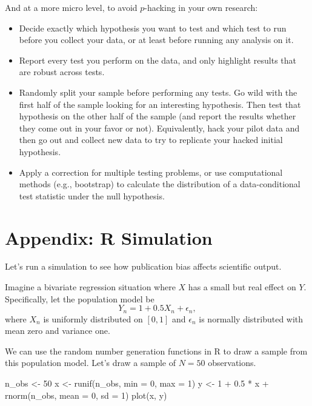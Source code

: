 \documentclass[
  12pt,
  oneside,openany]{book}
\newenvironment{Shaded}{\begin{snugshade}}{\end{snugshade}}
\newcommand{\AttributeTok}[1]{\textcolor[rgb]{0.77,0.63,0.00}{#1}}
\newcommand{\DecValTok}[1]{\textcolor[rgb]{0.00,0.00,0.81}{#1}}
\newcommand{\FloatTok}[1]{\textcolor[rgb]{0.00,0.00,0.81}{#1}}
\newcommand{\FunctionTok}[1]{\textcolor[rgb]{0.00,0.00,0.00}{#1}}
\newcommand{\NormalTok}[1]{#1}
\newcommand{\OtherTok}[1]{\textcolor[rgb]{0.56,0.35,0.01}{#1}}
\newcommand{\SpecialCharTok}[1]{\textcolor[rgb]{0.00,0.00,0.00}{#1}}
\begin{document}
And at a more micro level, to avoid \(p\)-hacking in your own research:

\begin{itemize}
\item
  Decide exactly which hypothesis you want to test and which test to run before you collect your data, or at least before running any analysis on it.
\item
  Report every test you perform on the data, and only highlight results that are robust across tests.
\item
  Randomly split your sample before performing any tests. Go wild with the first half of the sample looking for an interesting hypothesis. Then test that hypothesis on the other half of the sample (and report the results whether they come out in your favor or not). Equivalently, hack your pilot data and then go out and collect new data to try to replicate your hacked initial hypothesis.
\item
  Apply a correction for multiple testing problems, or use computational methods (e.g., bootstrap) to calculate the distribution of a data-conditional test statistic under the null hypothesis.
\end{itemize}

\hypertarget{appendix-r-simulation}{%
\section{Appendix: R Simulation}\label{appendix-r-simulation}}

Let's run a simulation to see how publication bias affects scientific output.

Imagine a bivariate regression situation where \(X\) has a small but real effect on \(Y\). Specifically, let the population model be
\[
Y_n = 1 + 0.5 X_n + \epsilon_n,
\]
where \(X_n\) is uniformly distributed on \([0, 1]\) and \(\epsilon_n\) is normally distributed with mean zero and variance one.

We can use the random number generation functions in R to draw a sample from this population model. Let's draw a sample of \(N = 50\) observations.

\begin{Shaded}
\begin{Highlighting}[]
\NormalTok{n\_obs }\OtherTok{\textless{}{-}} \DecValTok{50}
\NormalTok{x }\OtherTok{\textless{}{-}} \FunctionTok{runif}\NormalTok{(n\_obs, }\AttributeTok{min =} \DecValTok{0}\NormalTok{, }\AttributeTok{max =} \DecValTok{1}\NormalTok{)}
\NormalTok{y }\OtherTok{\textless{}{-}} \DecValTok{1} \SpecialCharTok{+} \FloatTok{0.5} \SpecialCharTok{*}\NormalTok{ x }\SpecialCharTok{+} \FunctionTok{rnorm}\NormalTok{(n\_obs, }\AttributeTok{mean =} \DecValTok{0}\NormalTok{, }\AttributeTok{sd =} \DecValTok{1}\NormalTok{)}
\FunctionTok{plot}\NormalTok{(x, y)}
\end{Highlighting}
\end{Shaded}
\end{document}
